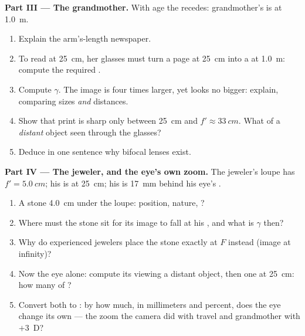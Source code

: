 \begin{problem}
\medskip
\noindent\textbf{Part III --- The grandmother.}
With age the  recedes: grandmother's is at \qty{1.0}{m}.
\begin{enumerate}[resume]
  \item Explain the arm's-length newspaper.
  \item To read at \qty{25}{cm}, her glasses must turn a page at
        \qty{25}{cm} into a  at \qty{1.0}{m}: compute the
        required .
  \item Compute $\gamma$. The image is four times larger, yet looks no
        bigger: explain, comparing sizes \emph{and} distances.
  \item Show that print is sharp only between \qty{25}{cm} and
        $f' \approx \qty{33}{cm}$. What of a \emph{distant} object seen
        through the glasses?
  \item Deduce in one sentence why bifocal lenses exist.
\end{enumerate}

\medskip
\noindent\textbf{Part IV --- The jeweler, and the eye's own zoom.}
The jeweler's loupe has $f' = \qty{5.0}{cm}$; his  is at
\qty{25}{cm}; his  is \qty{17}{mm} behind his eye's .
\begin{enumerate}[resume]
  \item A stone \qty{4.0}{cm} under the loupe: position, nature,
        ?
  \item Where must the stone sit for its image to fall at his , and what is $\gamma$ then?
  \item Why do experienced jewelers place the stone exactly at $F$
        instead (image at infinity)?
  \item Now the eye alone: compute its  viewing a distant
        object, then one at \qty{25}{cm}: how many  of
        ?
  \item Convert both  to : by how much, in
        millimeters and percent, does the eye change its own  --- the zoom the camera did with travel and grandmother
        with $+3$~D?
\end{enumerate}
\end{problem}
